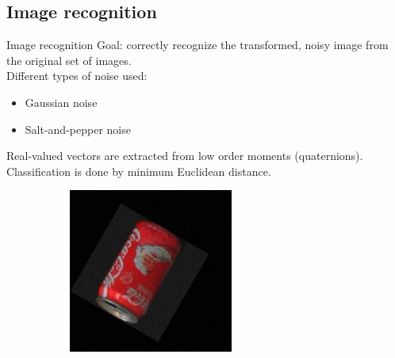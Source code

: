 \documentclass{beamer}
\begin{document}
\subsection{Image recognition}
\begin{frame}{Image recognition}
    \vskip 5mm
Goal: correctly recognize the transformed, noisy image from the original set of images. \\
Different types of noise used:
\begin{itemize}
    \item Gaussian noise
    \item Salt-and-pepper noise
\end{itemize}
Real-valued vectors are extracted from low order moments (quaternions). Classification is done by minimum Euclidean distance.
\begin{figure}[tbp]
    \begin{subfigure}{0.25\textwidth}
        \centering
    \includegraphics[width=\textwidth]{figures/noise/gauss5.png}
    \end{subfigure}
    \begin{subfigure}{0.25\textwidth}
        \centering

\end{subfigure}
\end{figure}
\end{frame}
\end{document}

